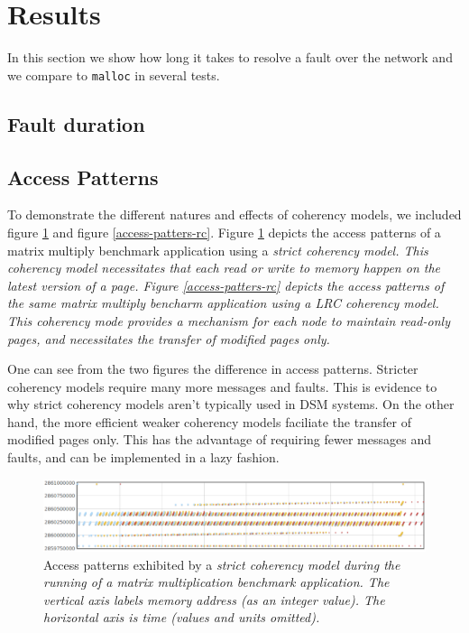 \section{Results}

In this section we show how long it takes to resolve a fault over the network and we compare \projname{} to \verb,malloc, in several tests.

\subsection{Fault duration}

\subsection{Access Patterns}

To demonstrate the different natures and effects of coherency models, we included figure \ref{access-patters-strict} and figure \ref{access-patters-rc}.  Figure \ref{access-patters-strict} depicts the access patterns of a matrix multiply benchmark application using a \em strict \em coherency model.  This coherency model necessitates that each read or write to memory happen on the latest version of a page.  Figure \ref{access-patters-rc} depicts the access patterns of the same matrix multiply bencharm application using a \em LRC \em coherency model.  This coherency mode provides a mechanism for each node to maintain read-only pages, and necessitates the transfer of modified pages only.

One can see from the two figures the difference in access patterns.  Stricter coherency models require many more messages and faults.  This is evidence to why strict coherency models aren't typically used in DSM systems.  On the other hand, the more efficient weaker coherency models faciliate the transfer of modified pages only.  This has the advantage of requiring fewer messages and faults, and can be implemented in a lazy fashion.

\begin{figure}[t]
\centering
\includegraphics[scale=0.40]{images/access-patterns-strict.eps}
\caption{Access patterns exhibited by a \em strict \em coherency model during the running of a matrix multiplication benchmark application.  The vertical axis labels memory address (as an integer value).  The horizontal axis is time (values and units omitted).}
\label{access-patters-strict}
\end{figure}

